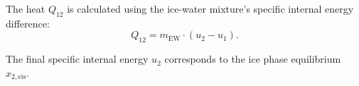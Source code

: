 The heat \( Q_{12} \) is calculated using the ice-water mixture's specific internal energy difference:  
\[
Q_{12} = m_{\text{EW}} \cdot (u_2 - u_1).
\]  

The final specific internal energy \( u_2 \) corresponds to the ice phase equilibrium \( x_{2,\text{eis}} \).